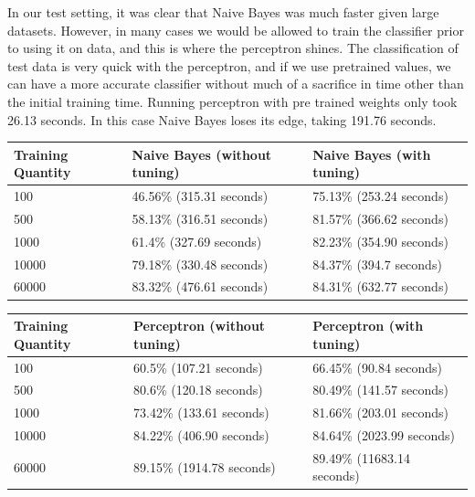 \documentclass{article}
\theoremstyle{remark}
\begin{document}
     In our test setting, it was clear that Naive Bayes was much faster given large datasets. However, in many cases we would be allowed to train the classifier prior to using it on data, and this is where the perceptron shines. The classification of test data is very quick with the perceptron, and if we use pretrained values, we can have a more accurate classifier without much of a sacrifice in time other than the initial training time. Running perceptron with pre trained weights only took 26.13 seconds. In this case Naive Bayes loses its edge, taking 191.76 seconds.
     \begin{table}[h!]
     	\centering
    	\begin{tabular}{l|l|l}
    	Training Quantity & Naive Bayes (without tuning) & Naive Bayes (with tuning) \\ \hline
    	100               & 46.56\% (315.31 seconds)     & 75.13\% (253.24 seconds)  \\
    	500               & 58.13\% (316.51 seconds)     & 81.57\% (366.62 seconds)   \\
    	1000              & 61.4\% (327.69 seconds)      & 82.23\% (354.90 seconds)   \\
    	10000             & 79.18\% (330.48 seconds)     & 84.37\% (394.7 seconds)    \\
    	60000             & 83.32\% (476.61 seconds)     & 84.31\% (632.77 seconds)   \\
    	\end{tabular}
     \end{table}
     \begin{table}[h!]
     	\centering
    \begin{tabular}{l|l|l}
    Training Quantity & Perceptron (without tuning) & Perceptron (with tuning)  \\ \hline
    100               & 60.5\% (107.21 seconds)     & 66.45\% (90.84 seconds)    \\
    500               & 80.6\% (120.18 seconds)     & 80.49\% (141.57 seconds)   \\
    1000              & 73.42\% (133.61 seconds)    & 81.66\% (203.01 seconds)   \\
    10000             & 84.22\% (406.90 seconds)    & 84.64\% (2023.99 seconds)  \\
    60000             & 89.15\% (1914.78 seconds)   & 89.49\% (11683.14 seconds) \\
    \end{tabular}\end{table}
\end{document}
